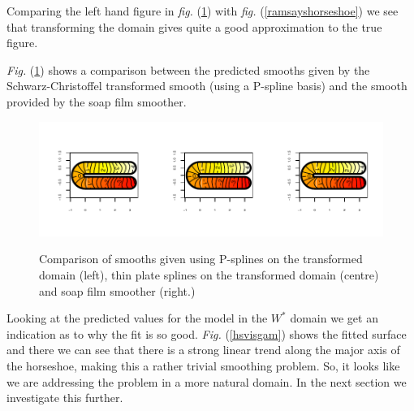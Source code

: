 \documentclass[a4paper,10pt]{amsart}
\newcommand{\sch}{Schwarz-Christoffel }
\newcommand{\fig}[1]{\emph{fig.} (\ref{#1})}
\newcommand{\Fig}[1]{\emph{Fig.} (\ref{#1})}
\begin{document}
Comparing the left hand figure in \fig{compsmooth} with \fig{ramsayshorseshoe} we see that transforming the domain gives quite a good approximation to the true figure.

\Fig{compsmooth} shows a comparison between the predicted smooths given by the \sch transformed smooth (using a P-spline basis) and the smooth provided by the soap film smoother. 


\begin{figure}
\centering
\includegraphics[trim=0.5in 0.5in 0in 0in]{figs/compsmooth.pdf} \\
\caption{Comparison of smooths given using P-splines on the transformed domain (left), thin plate splines on the transformed domain (centre) and soap film smoother (right.)}
\label{compsmooth}
\end{figure}


Looking at the predicted values for the model in the $W^*$ domain we get an indication as to why the fit is so good. \Fig{hsvisgam} shows the fitted surface and there we can see that there is a strong linear trend along the major axis of the horseshoe, making this a rather trivial smoothing problem. So, it looks like we are addressing the problem in a more natural domain. In the next section we investigate this further.
\end{document}
